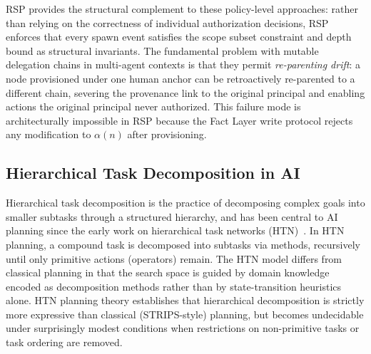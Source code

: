 RSP provides the structural complement to these policy-level approaches: rather than relying on the correctness of individual authorization decisions, RSP enforces that every spawn event satisfies the scope subset constraint and depth bound as structural invariants. The fundamental problem with mutable delegation chains in multi-agent contexts is that they permit \emph{re-parenting drift}: a node provisioned under one human anchor can be retroactively re-parented to a different chain, severing the provenance link to the original principal and enabling actions the original principal never authorized. This failure mode is architecturally impossible in RSP because the Fact Layer write protocol rejects any modification to $\alpha(n)$ after provisioning.

\subsection{Hierarchical Task Decomposition in AI}

Hierarchical task decomposition is the practice of decomposing complex goals into smaller subtasks through a structured hierarchy, and has been central to AI planning since the early work on hierarchical task networks (HTN)~\cite{erol1994htn,erol1996complexity}. In HTN planning, a compound task is decomposed into subtasks via methods, recursively until only primitive actions (operators) remain. The HTN model differs from classical planning in that the search space is guided by domain knowledge encoded as decomposition methods rather than by state-transition heuristics alone. HTN planning theory establishes that hierarchical decomposition is strictly more expressive than classical (STRIPS-style) planning, but becomes undecidable under surprisingly modest conditions when restrictions on non-primitive tasks or task ordering are removed.

